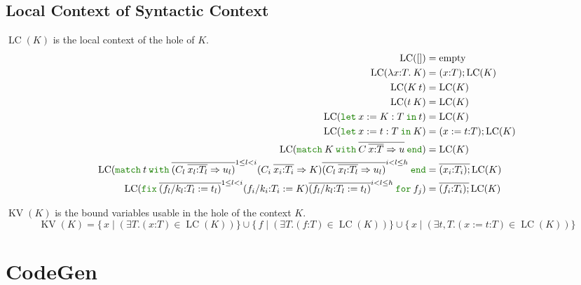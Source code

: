 \documentclass[a4paper,fleqn]{article}
\newcommand{\kwlet}{\mbox{\color{mygreen}\ttfamily let}}
\newcommand{\kwin}{\mbox{\color{mygreen}\ttfamily in}}
\newcommand{\kwmatch}{\mbox{\color{mygreen}\ttfamily match}}
\newcommand{\kwwith}{\mbox{\color{mygreen}\ttfamily with}}
\newcommand{\kwend}{\mbox{\color{mygreen}\ttfamily end}}
\newcommand{\kwfix}{\mbox{\color{mygreen}\ttfamily fix}}
\newcommand{\kwfor}{\mbox{\color{mygreen}\ttfamily for}}
\newcommand{\lamT}[3]{\lambda #1\mathord{:}#2.\:#3}
\newcommand{\lassum}[2]{(#1\mathord{:}#2)}
\newcommand{\ldef}[3]{(#1:=#2\mathord{:}#3)}
\newcommand{\letin}[3]{\kwlet\:#1:=#2\:\kwin\:#3}
\newcommand{\omatch}[2]{\kwmatch\:#1\:\kwwith\:{#2}\:\kwend}
\newcommand{\ofix}[2]{\kwfix\:{#1}\:\kwfor\:{#2}}
\DeclareMathOperator{\LC}{LC}
\DeclareMathOperator{\KV}{KV}
\newcommand{\rep}[1]{\overline{#1}}
\newcommand{\repi}[2]{\overline{#1}^{#2}}
\begin{document}
\subsection{Local Context of Syntactic Context}

$\LC(K)$ is the local context of the hole of $K$.
\begin{align*}
  \LC([]) &= \text{empty} \\
  \LC(\lamT{x}{T}{K}) &= \lassum{x}{T};  \LC(K) \\
  \LC(K\:t) &= \LC(K) \\
  \LC(t\:K) &= \LC(K) \\
  \LC(\letin{x}{K:T}{t}) &= \LC(K) \\
  \LC(\letin{x}{t:T}{K}) &= \ldef{x}{t}{T}; \LC(K) \\
  \LC(\omatch{K}{\rep{C\:\rep{x{:}T}\Rightarrow u}}) &= \LC(K) \\
  \LC(\omatch{t}{\repi{(C_l\:\rep{x_l{:}T_l}\Rightarrow u_l)}{1\leq l < i} (C_i\:\rep{x_i{:}T_i}\Rightarrow K) \repi{(C_l\:\rep{x_l{:}T_l}\Rightarrow u_l)}{i < l \leq h}} &= \rep{\lassum{x_i}{T_i};} \LC(K) \\
  \LC(\ofix{\repi{(f_l/k_l{:}T_l:=t_l)}{1\leq l < i} (f_i/k_i{:}T_i:=K) \repi{(f_l/k_l{:}T_l:=t_l)}{i < l \leq h}}{f_j}) &= \rep{\lassum{f_i}{T_i};} \LC(K)
\end{align*}

$\KV(K)$ is the bound variables usable in the hole of the context $K$.
\[
  \KV(K) = \{\, x \;|\; (\exists T. \lassum{x}{T} \in \LC(K)) \} \cup
           \{\, f \;|\; (\exists T. \lassum{f}{T} \in \LC(K)) \} \cup
           \{\, x \;|\; (\exists t,T. \ldef{x}{t}{T} \in \LC(K)) \}
\]

\section{CodeGen}\label{sec:codegen}
\end{document}
